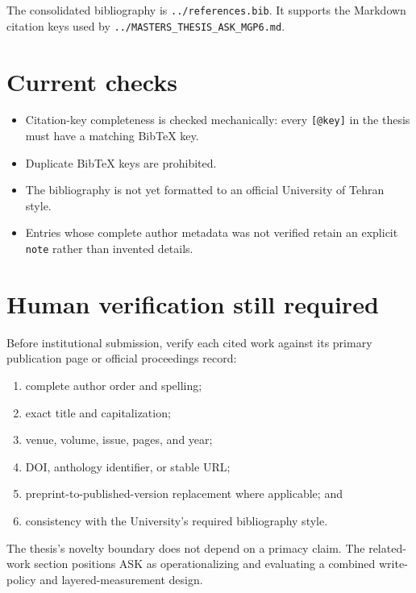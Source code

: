 The consolidated bibliography is \texttt{../references.bib}. It supports
the Markdown citation keys used by
\texttt{../MASTERS\_THESIS\_ASK\_MGP6.md}.

\section{Current checks}\label{current-checks}

\begin{itemize}
\tightlist
\item
  Citation-key completeness is checked mechanically: every
  \texttt{{[}@key{]}} in the thesis must have a matching BibTeX key.
\item
  Duplicate BibTeX keys are prohibited.
\item
  The bibliography is not yet formatted to an official University of
  Tehran style.
\item
  Entries whose complete author metadata was not verified retain an
  explicit \texttt{note} rather than invented details.
\end{itemize}

\section{Human verification still
required}\label{human-verification-still-required}

Before institutional submission, verify each cited work against its
primary publication page or official proceedings record:

\begin{enumerate}
\def\labelenumi{\arabic{enumi}.}
\tightlist
\item
  complete author order and spelling;
\item
  exact title and capitalization;
\item
  venue, volume, issue, pages, and year;
\item
  DOI, anthology identifier, or stable URL;
\item
  preprint-to-published-version replacement where applicable; and
\item
  consistency with the University's required bibliography style.
\end{enumerate}

The thesis's novelty boundary does not depend on a primacy claim. The
related-work section positions ASK as operationalizing and evaluating a
combined write-policy and layered-measurement design.
